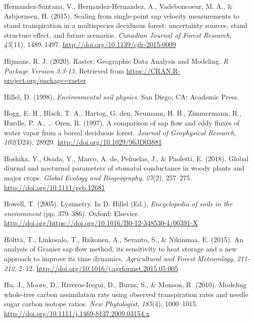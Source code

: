 \documentclass[11pt,twoside]{reedthesis}
\begin{document}
\hypertarget{ref-Hernandez-Santana2015}{}
Hernandez-Santana, V., Hernandez-Hernandez, A., Vadeboncoeur, M. A., \&
Asbjornsen, H. (2015). Scaling from single-point sap velocity
measurements to stand transpiration in a multispecies deciduous forest:
uncertainty sources, stand structure effect, and future scenarios.
\emph{Canadian Journal of Forest Research}, \emph{45}(11), 1489--1497.
\url{http://doi.org/10.1139/cjfr-2015-0009}

\hypertarget{ref-hijmans_raster_2020}{}
Hijmans, R. J. (2020). Raster: Geographic Data Analysis and Modeling.
\emph{R Package Version 3.3-13.} Retrieved from
\url{https://CRAN.R-project.org/package=raster}

\hypertarget{ref-hillel_environmental_1998}{}
Hillel, D. (1998). \emph{Environmental soil physics}. San Diego, CA:
Academic Press.

\hypertarget{ref-Hogg1997}{}
Hogg, E. H., Black, T. A., Hartog, G. den, Neumann, H. H., Zimmermann,
R., Hurdle, P. A., \ldots{} Oren, R. (1997). A comparison of sap flow
and eddy fluxes of water vapor from a boreal deciduous forest.
\emph{Journal of Geophysical Research}, \emph{102}(D24), 28929.
\url{http://doi.org/10.1029/96JD03881}

\hypertarget{ref-hoshika_global_2018}{}
Hoshika, Y., Osada, Y., Marco, A. de, Peñuelas, J., \& Paoletti, E.
(2018). Global diurnal and nocturnal parameters of stomatal conductance
in woody plants and major crops. \emph{Global Ecology and Biogeography},
\emph{27}(2), 257--275. \url{http://doi.org/10.1111/geb.12681}

\hypertarget{ref-Howell2005}{}
Howell, T. (2005). Lysimetry. In D. Hillel (Ed.), \emph{Encyclopedia of
soils in the environment} (pp. 379--386). Oxford: Elsevier.
\url{http://doi.org/https://doi.org/10.1016/B0-12-348530-4/00391-X}

\hypertarget{ref-Holtta2015}{}
Hölttä, T., Linkosalo, T., Riikonen, A., Sevanto, S., \& Nikinmaa, E.
(2015). An analysis of Granier sap flow method, its sensitivity to heat
storage and a new approach to improve its time dynamics.
\emph{Agricultural and Forest Meteorology}, \emph{211-212}, 2--12.
\url{http://doi.org/10.1016/j.agrformet.2015.05.005}

\hypertarget{ref-Hu2010}{}
Hu, J., Moore, D., Riveros-Iregui, D., Burns, S., \& Monson, R. (2010).
Modeling whole-tree carbon assimilation rate using observed
transpiration rates and needle sugar carbon isotope ratios. \emph{New
Phytologist}, \emph{185}(4), 1000--1015.
\url{http://doi.org/10.1111/j.1469-8137.2009.03154.x}
\end{document}
